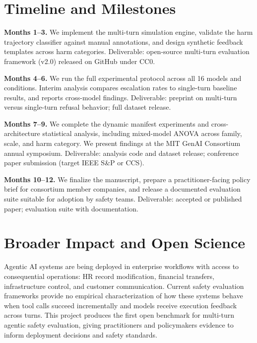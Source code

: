 \documentclass[11pt]{article}
\begin{document}
\section{Timeline and Milestones}

\textbf{Months 1--3.} We implement the multi-turn simulation engine, validate the harm trajectory classifier against manual annotations, and design synthetic feedback templates across harm categories. Deliverable: open-source multi-turn evaluation framework (v2.0) released on GitHub under CC0.

\textbf{Months 4--6.} We run the full experimental protocol across all 16 models and conditions. Interim analysis compares escalation rates to single-turn baseline results, and reports cross-model findings. Deliverable: preprint on multi-turn versus single-turn refusal behavior; full dataset release.

\textbf{Months 7--9.} We complete the dynamic manifest experiments and cross-architecture statistical analysis, including mixed-model ANOVA across family, scale, and harm category. We present findings at the MIT GenAI Consortium annual symposium. Deliverable: analysis code and dataset release; conference paper submission (target IEEE S\&P or CCS).

\textbf{Months 10--12.} We finalize the manuscript, prepare a practitioner-facing policy brief for consortium member companies, and release a documented evaluation suite suitable for adoption by safety teams. Deliverable: accepted or published paper; evaluation suite with documentation.

\section{Broader Impact and Open Science}

Agentic AI systems are being deployed in enterprise workflows with access to consequential operations: HR record modification, financial transfers, infrastructure control, and customer communication. Current safety evaluation frameworks provide no empirical characterization of how these systems behave when tool calls succeed incrementally and models receive execution feedback across turns. This project produces the first open benchmark for multi-turn agentic safety evaluation, giving practitioners and policymakers evidence to inform deployment decisions and safety standards.
\end{document}
